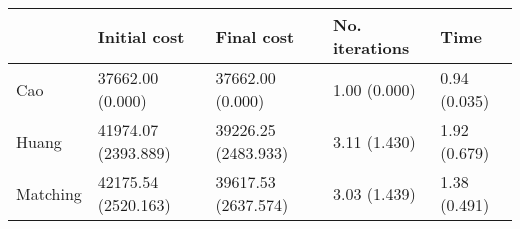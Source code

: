 \begin{tabular}{lllll}
\toprule
{} &         Initial cost &           Final cost & No. iterations &          Time \\
\midrule
Cao      &     37662.00 (0.000) &     37662.00 (0.000) &   1.00 (0.000) &  0.94 (0.035) \\
Huang    &  41974.07 (2393.889) &  39226.25 (2483.933) &   3.11 (1.430) &  1.92 (0.679) \\
Matching &  42175.54 (2520.163) &  39617.53 (2637.574) &   3.03 (1.439) &  1.38 (0.491) \\
\bottomrule
\end{tabular}
